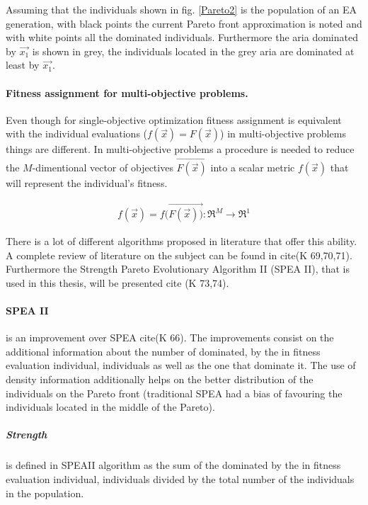 Assuming that the individuals shown in fig. \ref{Pareto2} is the population of an EA generation, with black points the current Pareto front approximation is noted and with white points all the dominated individuals. Furthermore the aria dominated by $\overrightarrow{x_1}$ is shown in grey, the individuals located in the grey aria are dominated at least by $\overrightarrow{x_1}$. 

\paragraph{Fitness assignment for multi-objective problems.}
Even though for single-objective optimization fitness assignment is equivalent with the individual evaluations ($f(\overrightarrow{x})=F(\overrightarrow{x})$) in multi-objective problems things are different. In multi-objective problems a procedure is needed to reduce the $M$-dimentional vector of objectives $\overrightarrow{F(\overrightarrow{x})}$ into a scalar metric $f(\overrightarrow{x})$ that will represent the individual's fitness. 

\begin{eqnarray}
    f(\overrightarrow{x})=f(\overrightarrow{F(\overrightarrow{x}))} :\Re ^M \rightarrow \Re ^1 
\end{eqnarray}

There is a lot of different algorithms proposed in literature that offer this ability. A complete review of literature on the subject can be found in cite(K 69,70,71). Furthermore the Strength Pareto Evolutionary Algorithm II (SPEA II), that is used in this thesis, will be presented cite (K 73,74).

\paragraph{SPEA II}
is an improvement over SPEA cite(K 66). The improvements consist on the additional information about the number of dominated, by the in fitness evaluation individual, individuals as well as the one that dominate it. The use of density information additionally helps on the better distribution of the individuals on the Pareto front (traditional SPEA had a bias of favouring the individuals located in the middle of the Pareto). 

\subparagraph{Strength} is defined in SPEAII algorithm as the sum of the dominated      by the in fitness evaluation individual, individuals divided by the total number of the individuals in the population.  


